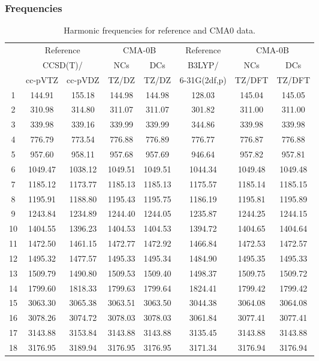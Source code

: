 \documentclass[10pt,oneside]{article}
\begin{document}
\subsubsection*{Frequencies}
\begin{table}[h!]
\centering
\caption{Harmonic frequencies for reference and CMA0 data.}
\begin{tabular}{cccccccc}
\toprule
{} & \multicolumn{2}{c}{Reference} & \multicolumn{2}{c}{CMA-0B} &    Reference & \multicolumn{2}{c}{CMA-0B} \\
{} & \multicolumn{2}{c}{CCSD(T)/} &     NCs &     DCs &       B3LYP/ &     NCs &     DCs \\
{} &   cc-pVTZ & cc-pVDZ &   TZ/DZ &   TZ/DZ & 6-31G(2df,p) &  TZ/DFT &  TZ/DFT \\
\midrule
1  &    144.91 &  155.18 &  144.98 &  144.98 &       128.03 &  145.04 &  145.05 \\
2  &    310.98 &  314.80 &  311.07 &  311.07 &       301.82 &  311.00 &  311.00 \\
3  &    339.98 &  339.16 &  339.99 &  339.99 &       344.86 &  339.98 &  339.98 \\
4  &    776.79 &  773.54 &  776.88 &  776.89 &       776.77 &  776.87 &  776.88 \\
5  &    957.60 &  958.11 &  957.68 &  957.69 &       946.64 &  957.82 &  957.81 \\
6  &   1049.47 & 1038.12 & 1049.51 & 1049.51 &      1044.34 & 1049.48 & 1049.48 \\
7  &   1185.12 & 1173.77 & 1185.13 & 1185.13 &      1175.57 & 1185.14 & 1185.15 \\
8  &   1195.91 & 1188.80 & 1195.43 & 1195.75 &      1186.19 & 1195.81 & 1195.89 \\
9  &   1243.84 & 1234.89 & 1244.40 & 1244.05 &      1235.87 & 1244.25 & 1244.15 \\
10 &   1404.55 & 1396.23 & 1404.53 & 1404.53 &      1394.72 & 1404.65 & 1404.64 \\
11 &   1472.50 & 1461.15 & 1472.77 & 1472.92 &      1466.84 & 1472.53 & 1472.57 \\
12 &   1495.32 & 1477.57 & 1495.33 & 1495.34 &      1484.90 & 1495.35 & 1495.33 \\
13 &   1509.79 & 1490.80 & 1509.53 & 1509.40 &      1498.37 & 1509.75 & 1509.72 \\
14 &   1799.60 & 1818.33 & 1799.63 & 1799.64 &      1824.41 & 1799.42 & 1799.42 \\
15 &   3063.30 & 3065.38 & 3063.51 & 3063.50 &      3044.38 & 3064.08 & 3064.08 \\
16 &   3078.26 & 3074.72 & 3078.03 & 3078.03 &      3061.84 & 3077.41 & 3077.41 \\
17 &   3143.88 & 3153.84 & 3143.88 & 3143.88 &      3135.45 & 3143.88 & 3143.88 \\
18 &   3176.95 & 3189.94 & 3176.95 & 3176.95 &      3171.34 & 3176.94 & 3176.94 \\
\bottomrule
\end{tabular}
\end{table}
\end{document}
